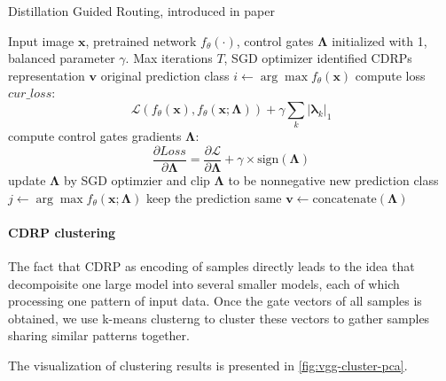 \documentclass[sigplan,10pt,review]{acmart}\settopmatter{printfolios=true,printccs=false,printacmref=false}
\begin{document}
\begin{algorithm}
	\caption{Distillation Guided Routing, introduced in paper \cite{wang2018interpret}}
	\label{alg:dgr}
	\begin{algorithmic}[1]
		\Require Input image $\boldsymbol{x}$, pretrained network $f_\theta(\cdot)$, control gates $\boldsymbol{\Lambda}$ initialized with 1, balanced parameter $\gamma$. Max iterations $T$, SGD optimizer
		\Ensure identified CDRPs representation $\boldsymbol{v}$
		\State original prediction class $i \gets \arg\max f_\theta(\boldsymbol{x})$
			\State compute loss $cur\_loss$: $$\mathcal{L}\left(f_\theta(\boldsymbol{x}), f_\theta(\boldsymbol{x}; \boldsymbol{\Lambda})\right) + \gamma \sum_k |\boldsymbol{\lambda}_k|_1$$
			\State compute control gates gradients $\boldsymbol{\Lambda}$: $$\frac{\partial Loss}{\partial \boldsymbol{\Lambda}} = \frac{\partial \mathcal{L}}{\partial \boldsymbol{\Lambda}} + \gamma \times \mathrm{sign}(\boldsymbol{\Lambda})$$
			\State update $\boldsymbol{\Lambda}$ by SGD optimzier and clip $\boldsymbol{\Lambda}$ to be nonnegative
			\State new prediction class $j \gets \arg\max f_\theta(\boldsymbol{x};\boldsymbol{\Lambda})$
			 \Comment keep the prediction same
					\State $\boldsymbol{v} \gets \mathrm{concatenate}(\boldsymbol{\Lambda})$
				\EndIf
			\EndIf
		\EndFor		
	\end{algorithmic}
\end{algorithm}

\paragraph{CDRP clustering}

The fact that CDRP as encoding of samples directly leads to the idea that decompoisite one large model into several smaller models, each of which processing one pattern of input data. Once the gate vectors of all samples is obtained, we use k-means clusterng to cluster these vectors to gather samples sharing similar patterns together.

The visualization of clustering results is presented in \cref{fig:vgg-cluster-pca}.
\end{document}
